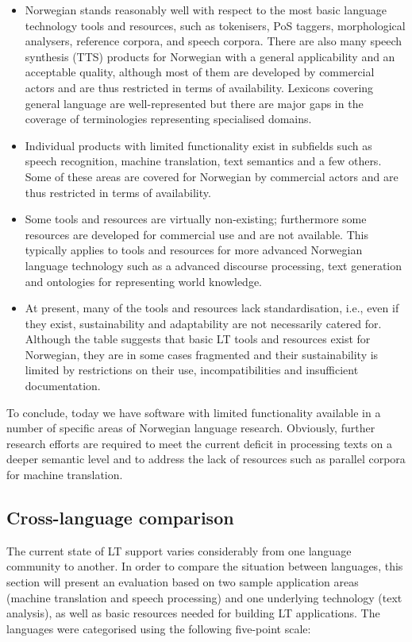 \begin{multicols}{2}
\begin{itemize}
\item Norwegian stands reasonably well with respect to the most basic language technology tools and resources, such as tokenisers, PoS taggers, morphological analysers, reference corpora, and speech corpora. 
There are also many speech synthesis (TTS) products for Norwegian with a general applicability and an acceptable quality, although most of them are developed by commercial actors and are thus restricted in terms of availability. Lexicons covering general language are well-represented but there are major gaps in the coverage of terminologies representing specialised domains.
\item Individual products with limited functionality exist in subfields such as speech recognition, machine translation, text semantics and a few others. 
Some of these areas are covered for Norwegian by commercial actors and are thus restricted in terms of availability.
\item Some tools and resources are virtually non-existing; furthermore some resources are developed for commercial use and are not available. 
This typically applies to tools and resources for more advanced Norwegian language technology such as a advanced discourse processing, text generation and ontologies for representing world knowledge.
\item At present, many of the tools and resources lack standardisation, i.e., even if they exist, sustainability and adaptability are not necessarily catered for. 
Although the table suggests that basic LT tools and resources exist for Norwegian, they are in some cases fragmented and their sustainability is limited by restrictions on their use, incompatibilities and insufficient documentation. 
\end{itemize}

To conclude, today we have software with limited functionality available in a number of specific areas of Norwegian language research. 
Obviously, further research efforts are required to meet the current deficit in processing texts on a deeper semantic level and to address the lack of resources such as parallel corpora for machine translation.

\subsection{Cross-language comparison}


The current state of LT support varies considerably from one language community to another. In order to compare the situation between languages, this section will present an evaluation based on two sample application areas (machine translation and speech processing) and one underlying technology (text analysis), as well as basic resources needed for building LT applications. The languages were categorised using the following five-point scale: 


\end{multicols}
